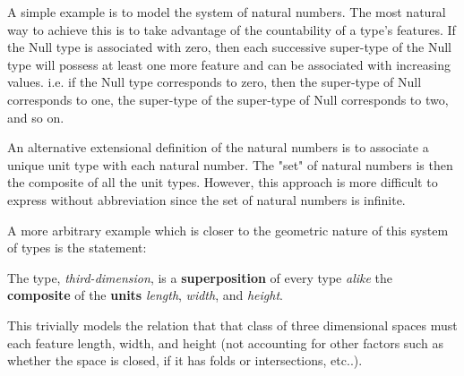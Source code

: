 \documentclass{article}
\begin{document}
A simple example is to model the system of natural numbers.
The most natural way to achieve this is to take advantage of the countability of a type's features.
If the Null type is associated with zero, then each successive super-type of the Null type will possess at least one more feature and can be associated with increasing values.
i.e. if the Null type corresponds to zero, then the super-type of Null corresponds to one, the super-type of the super-type of Null corresponds to two, and so on.

An alternative extensional definition of the natural numbers is to associate a unique unit type with each natural number. The "set" of natural numbers is then the composite of all the unit types. However, this approach is more difficult to express without abbreviation since the set of natural numbers is infinite.

A more arbitrary example which is closer to the geometric nature of this system of types is the statement: 
\begin{center} 
The type, \textit{third-dimension}, is a \textbf{superposition} of every type \textit{alike} the \textbf{composite} of the \textbf{units} \textit{length}, \textit{width}, and \textit{height}.
\end{center}
This trivially models the relation that that class of three dimensional spaces must each feature length, width, and height (not accounting for other factors such as whether the space is closed, if it has folds or intersections, etc..).
\end{document}
